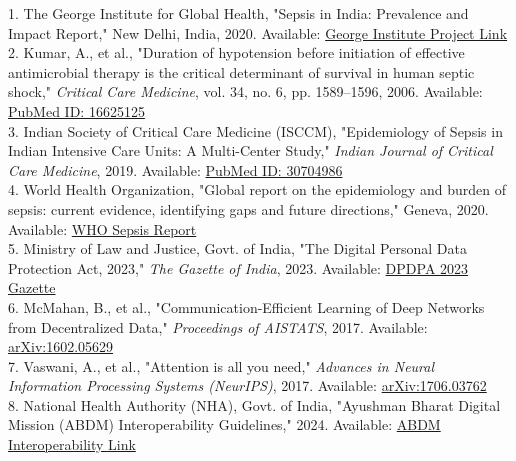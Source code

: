 \documentclass[11pt, a4paper]{article}
\begin{document}
\small
1. The George Institute for Global Health, "Sepsis in India: Prevalence and Impact Report," New Delhi, India, 2020. Available: \href{https://www.georgeinstitute.org.in/projects/sepsis-in-india-prevalence-study-sips}{\textcolor{blueBorder}{George Institute Project Link}}\\
2. Kumar, A., et al., "Duration of hypotension before initiation of effective antimicrobial therapy is the critical determinant of survival in human septic shock," \textit{Critical Care Medicine}, vol. 34, no. 6, pp. 1589--1596, 2006. Available: \href{https://pubmed.ncbi.nlm.nih.gov/16625125/}{\textcolor{blueBorder}{PubMed ID: 16625125}}\\
3. Indian Society of Critical Care Medicine (ISCCM), "Epidemiology of Sepsis in Indian Intensive Care Units: A Multi-Center Study," \textit{Indian Journal of Critical Care Medicine}, 2019. Available: \href{https://pubmed.ncbi.nlm.nih.gov/30704986/}{\textcolor{blueBorder}{PubMed ID: 30704986}}\\
4. World Health Organization, "Global report on the epidemiology and burden of sepsis: current evidence, identifying gaps and future directions," Geneva, 2020. Available: \href{https://www.who.int/publications/i/item/9789240010789}{\textcolor{blueBorder}{WHO Sepsis Report}}\\
5. Ministry of Law and Justice, Govt. of India, "The Digital Personal Data Protection Act, 2023," \textit{The Gazette of India}, 2023. Available: \href{https://www.meity.gov.in/content/digital-personal-data-protection-act-2023}{\textcolor{blueBorder}{DPDPA 2023 Gazette}}\\
6. McMahan, B., et al., "Communication-Efficient Learning of Deep Networks from Decentralized Data," \textit{Proceedings of AISTATS}, 2017. Available: \href{https://arxiv.org/abs/1602.05629}{\textcolor{blueBorder}{arXiv:1602.05629}}\\
7. Vaswani, A., et al., "Attention is all you need," \textit{Advances in Neural Information Processing Systems (NeurIPS)}, 2017. Available: \href{https://arxiv.org/abs/1706.03762}{\textcolor{blueBorder}{arXiv:1706.03762}}\\
8. National Health Authority (NHA), Govt. of India, "Ayushman Bharat Digital Mission (ABDM) Interoperability Guidelines," 2024. Available: \href{https://abdm.gov.in/}{\textcolor{blueBorder}{ABDM Interoperability Link}}
\end{document}
